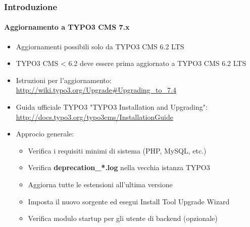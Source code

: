 \begin{frame}[fragile]
	\frametitle{Introduzione}
	\framesubtitle{Aggiornamento a TYPO3 CMS 7.x}

	\begin{itemize}
		\item Aggiornamenti possibili solo da TYPO3 CMS 6.2 LTS
		\item TYPO3 CMS < 6.2 deve essere prima aggiornato a TYPO3 CMS 6.2 LTS
	\end{itemize}

	\begin{itemize}

		\item Istruzioni per l'aggiornamento:\newline
			\smaller\url{http://wiki.typo3.org/Upgrade#Upgrading_to_7.4}\normalsize
		\item Guida ufficiale TYPO3 "TYPO3 Installation and Upgrading":
			\smaller\url{http://docs.typo3.org/typo3cms/InstallationGuide}\normalsize
		\item Approcio generale:
			\begin{itemize}
				\item Verifica i requisiti minimi di sistema \small(PHP, MySQL, etc.)
				\item Verifica \textbf{deprecation\_*.log} nella vecchia istanza TYPO3
				\item Aggiorna tutte le estensioni all'ultima versione
				\item Imposta il nuovo sorgente ed esegui Install Tool \textrightarrow Upgrade Wizard
				\item Verifica modulo startup per gli utente di backend (opzionale)
			\end{itemize}
	\end{itemize}

\end{frame}

